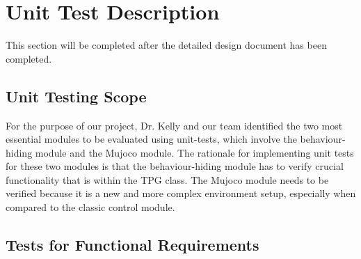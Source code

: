 \documentclass[12pt, titlepage]{article}
\begin{document}
\section{Unit Test Description}

This section will be completed after the detailed design document has been completed.




\subsection{Unit Testing Scope}

For the purpose of our project, Dr. Kelly and our team identified the two most essential modules to be evaluated using unit-tests, which involve the behaviour-hiding module and the Mujoco module. The rationale for implementing unit tests for these two modules is that the behaviour-hiding module has to verify crucial functionality that is within the TPG class. The Mujoco module needs to be verified because it is a new and more complex environment setup, especially when compared to the classic control module.


\subsection{Tests for Functional Requirements}
\end{document}
